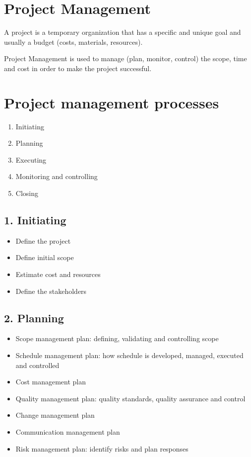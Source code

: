 \section{Project Management}
A project is a temporary organization that has a specific and unique goal and usually a budget (costs, materials, resources).

Project Management is used to manage (plan, monitor, control) the scope, time and cost in order to make the project successful.

\section{Project management processes}
\begin{enumerate}
    \item Initiating
    \item Planning
    \item Executing
    \item Monitoring and controlling
    \item Closing
\end{enumerate}
\subsection{1. Initiating}
\begin{itemize}
    \item Define the project
    \item Define initial scope
    \item Estimate cost and resources
    \item Define the stakeholders
\end{itemize}

\subsection{2. Planning}
\begin{itemize}
    \item Scope management plan: defining, validating and controlling scope
    \item Schedule management plan: how schedule is developed, managed, executed and controlled
    \item Cost management plan
    \item Quality management plan: quality standards, quality assurance and control
    \item Change management plan
    \item Communication management plan
    \item Risk management plan: identify risks and plan responses
\end{itemize}

